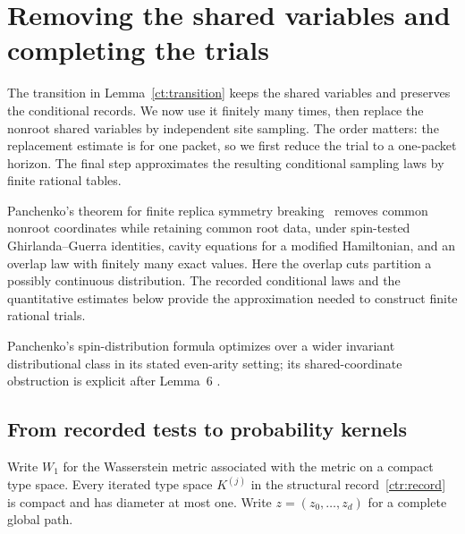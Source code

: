 \section{Removing the shared variables and completing the trials}\label{cc:section}

The transition in Lemma~\ref{ct:transition} keeps the shared variables
and preserves the conditional records. We now use it finitely many times,
then replace the nonroot shared variables by independent site sampling.
The order matters: the replacement estimate is for one packet, so we first
reduce the trial to a one-packet horizon. The final step approximates the
resulting conditional sampling laws by finite rational tables.

Panchenko's theorem for finite replica symmetry breaking~\cite[arXiv version, Theorem~2]{Panchenko2015FRSB}
removes common nonroot coordinates while retaining common root data, under
spin-tested Ghirlanda--Guerra identities, cavity equations for a modified
Hamiltonian, and an overlap law with finitely many exact values.
Here the overlap cuts partition a possibly continuous distribution.
The recorded conditional laws and the quantitative estimates below provide
the approximation needed to construct finite rational trials.

Panchenko's spin-distribution formula optimizes over a wider invariant
distributional class in its stated even-arity setting; its shared-coordinate
obstruction is explicit after Lemma~6
\cite[arXiv version, Theorem~2 and the Remark after Lemma~6]{Panchenko2013SD}.

\subsection{From recorded tests to probability kernels}

Write $W_1$ for the Wasserstein metric associated with the metric on a
compact type space.  Every iterated type space $K^{(j)}$ in
the structural record~\eqref{ctr:record} is compact and has diameter
at most one. Write $z=(z_0,\ldots,z_d)$ for a complete global path.


